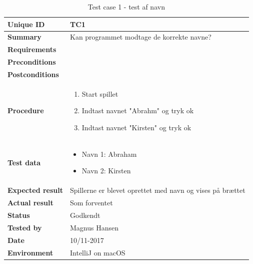 \begin{table}[H]
    \begin{center}
        \begin{tabular}{|l|p{8cm}|}
            \hline
            \textbf{Unique ID} & TC1 \\
            \hline
            \textbf{Summary} & Kan programmet modtage de korrekte navne? \\
            \hline
            \textbf{Requirements} & \\
            \hline
            \textbf{Preconditions} & \\
            \hline
            \textbf{Postconditions} & \\
            \hline
            \textbf{Procedure} & \begin{enumerate}
                \setlength\itemsep{0ex}
                \item Start spillet
                \item Indtast navnet "Abrahm" og tryk ok
                \item Indtast navnet "Kirsten" og tryk ok
            \end{enumerate} \\
            \hline
            \textbf{Test data} & \begin{itemize}
                \setlength\itemsep{0ex}
                \item Navn 1: Abraham
                \item Navn 2: Kirsten
            \end{itemize} \\
            \hline
            \textbf{Expected result} & Spillerne er blevet oprettet med navn og vises på brættet \\
            \hline
            \textbf{Actual result} & Som forventet \\
            \hline
            \textbf{Status} & Godkendt \\
            \hline
            \textbf{Tested by} & Magnus Hansen \\
            \hline
            \textbf{Date} & 10/11-2017 \\
            \hline
            \textbf{Environment} & IntelliJ on macOS \\
            \hline
        \end{tabular}
    \end{center}
    \caption{Test case 1 - test af navn}
    \label{tc:1}
\end{table}

